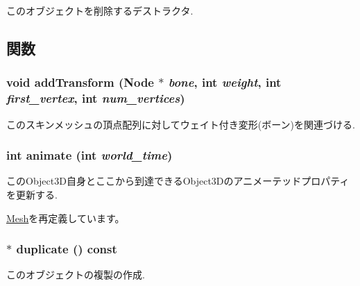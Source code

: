 このオブジェクトを削除するデストラクタ. 

\subsection{関数}
\hypertarget{classm3g_1_1SkinnedMesh_05077c4ee16f87ed4163f4d7a5f4f735}{
\subsubsection[{addTransform}]{\setlength{\rightskip}{0pt plus 5cm}void addTransform ({\bf Node} $\ast$ {\em bone}, \/  int {\em weight}, \/  int {\em first\_\-vertex}, \/  int {\em num\_\-vertices})}}
\label{classm3g_1_1SkinnedMesh_05077c4ee16f87ed4163f4d7a5f4f735}


このスキンメッシュの頂点配列に対してウェイト付き変形(ボーン)を関連づける. \hypertarget{classm3g_1_1SkinnedMesh_8aad1ceab4c2a03609c8a42324ce484d}{
\subsubsection[{animate}]{\setlength{\rightskip}{0pt plus 5cm}int animate (int {\em world\_\-time})}}
\label{classm3g_1_1SkinnedMesh_8aad1ceab4c2a03609c8a42324ce484d}


このObject3D自身とここから到達できるObject3Dのアニメーテッドプロパティを更新する. 

\hyperlink{classm3g_1_1Mesh_8aad1ceab4c2a03609c8a42324ce484d}{Mesh}を再定義しています。\hypertarget{classm3g_1_1SkinnedMesh_d3f422cf7656b73687d789094c7eae42}{
\subsubsection[{duplicate}]{ $\ast$ duplicate () const}}
\label{classm3g_1_1SkinnedMesh_d3f422cf7656b73687d789094c7eae42}


このオブジェクトの複製の作成. 

